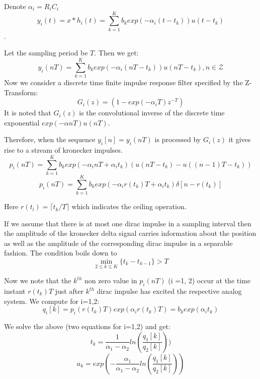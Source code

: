 \documentclass{article}
\begin{document}
Denote $\alpha_i=R_iC_i$ $$y_i(t) = x * h_i (t) = \sum_{k=1}^K b_k exp(-\alpha_i (t - t_k)) u(t - t_k)$$.

Let the sampling period be $T$. Then we get:
$$y_i (nT) = \sum_{k=1}^K b_k exp(-\alpha_i (nT - t_k)) u(nT - t_k), n \in \mathcal{Z}$$
Now we consider a discrete time finite impulse response filter specified by the Z-Transform:
$$G_i(z) = (1 - exp(-\alpha_i T)z^{-T})$$ It is noted that $G_i(z)$ is the convolutional inverse of the discrete time exponential $exp(-\alpha nT) u(nT)$.

Therefore, when the sequence $y_i[n] = y_i(nT)$ is processed by $G_i(z)$ it gives rise to a stream of kronecker impulses.
$$p_i(nT) = \sum_{k=1}^K b_k exp(-\alpha_i nT + \alpha_i t_k) (u(nT - t_k) - u((n-1)T -t_k))$$
$$p_i(nT) = \sum_{k=1}^K b_k exp(-\alpha_i r(t_k) T + \alpha_i t_k) \delta[n-r(t_k)]$$

Here $r(t_l) = \lceil t_k / T \rceil$ which indicates the ceiling operation.

If we assume that there is at most one dirac impulse in a sampling interval then the amplitude of the kronecker delta signal carries information about the position as well as the amplitude of the corresponding dirac impulse in a separable fashion. The condition boils down to
$$\min_{2 \le k \le K} \{t_k - t_{k-1}\} > T$$

Now we note that the $k^{th}$ non zero value in $p_i(nT)$ (i =1, 2) occur at the time instant $r(t_k)T$ just after $k^{th}$ dirac impulse has excited the respective analog system. We compute for i=1,2:
$$q_i[k] = p_i(r(t_k)T)exp(\alpha_i r(t_k) T) = b_k exp(\alpha_i t_k)$$

We solve the above (two equations for i=1,2) and get:
$$t_k = \frac{1}{\alpha_1 - \alpha_2} ln (\frac{q_1[k]}{q_2[k]}))$$
$$a_k = exp(-\frac{\alpha_1}{\alpha_1 - \alpha_2} ln(\frac{q_1[k]}{q_2[k]}))$$
\end{document}
